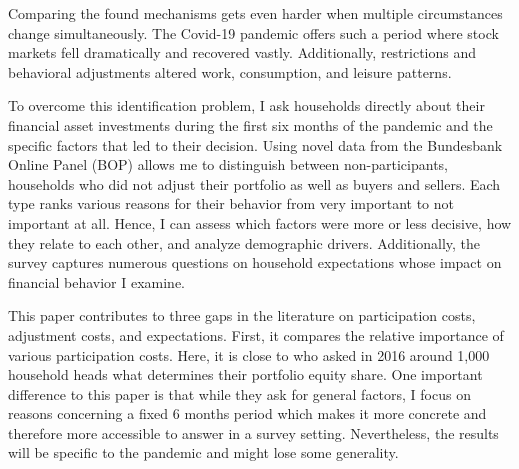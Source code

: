\documentclass[ProjectABM]{subfiles}
\begin{document}
Comparing the found mechanisms gets even harder when multiple circumstances change simultaneously. The Covid-19 pandemic offers such a period where stock markets fell dramatically and recovered vastly. Additionally, restrictions and behavioral adjustments altered work, consumption, and leisure patterns.

 To overcome this identification problem, I ask households directly about their financial asset investments during the first six months of the pandemic and the specific factors that led to their decision. 
 Using novel data from the Bundesbank Online Panel (BOP) allows me to distinguish between non-participants, households who did not adjust their portfolio as well as buyers and sellers. Each type ranks various reasons for their behavior from very important to not important at all. Hence, I can assess which factors were more or less decisive, how they relate to each other, and analyze demographic drivers. 
 Additionally, the survey captures numerous questions on household expectations whose impact on financial behavior I examine. %



This paper contributes to three gaps in the literature on participation costs, adjustment costs, and expectations. First, it compares the relative importance of various participation costs. Here, it is close to \cite{choi_2020} who asked in 2016 around 1,000 household heads what determines their portfolio equity share. One important difference to this paper is that while they ask for general factors, I focus on reasons concerning a fixed 6 months period which makes it more concrete and therefore more accessible to answer in a survey setting. Nevertheless, the results will be specific to the pandemic and might lose some generality. %
\end{document}

